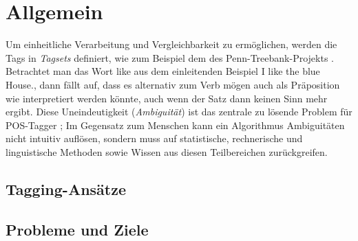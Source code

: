 %
\chapter{Allgemein}
\label{sec:general}

Um einheitliche Verarbeitung und Vergleichbarkeit zu ermöglichen, werden die Tags in \textit{Tagsets} definiert, wie zum Beispiel dem des Penn-Treebank-Projekts \linebreak \cite{Web:PennBank:2003}. \newline
Betrachtet man das Wort \glqq like \grqq{} aus dem einleitenden Beispiel \glqq I like the blue House.\grqq, dann fällt auf, dass es alternativ zum Verb \glqq mögen\grqq{} auch als Präposition \glqq wie\grqq{} interpretiert werden könnte, auch wenn der Satz dann keinen Sinn mehr ergibt. Diese Uneindeutigkeit (\textit{Ambiguität}) ist das zentrale zu lösende Problem für POS-Tagger  \cite{Smith:2011}; Im Gegensatz zum Menschen kann ein Algorithmus Ambiguitäten nicht intuitiv auflösen, sondern muss auf statistische, rechnerische und linguistische Methoden sowie Wissen aus diesen Teilbereichen zurückgreifen. \newline

\section{Tagging-Ansätze}
\label{sec:general:types}

\section{Probleme und Ziele}
\label{sec:generals:goals}



%
%
%
%
%


